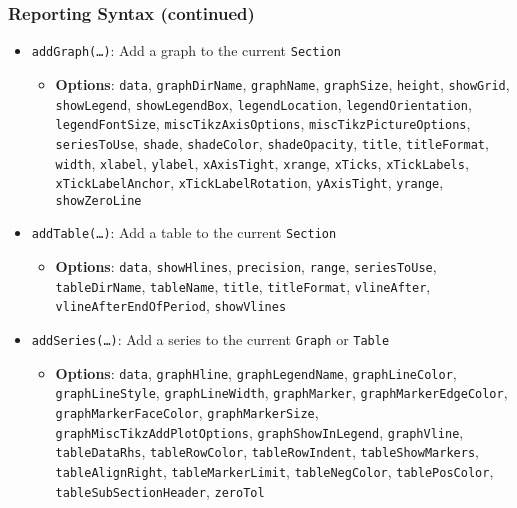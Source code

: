 \documentclass[10pt]{beamer}
\begin{document}
\begin{frame}
  \frametitle{Reporting Syntax (continued)}
  \begin{itemize}
  \item \texttt{addGraph(\ldots)}: Add a graph to the current \texttt{Section}
    \begin{itemize}
    \item \textbf{Options}: \texttt{data}, \texttt{graphDirName}, \texttt{graphName}, \texttt{graphSize}, \texttt{height}, \texttt{showGrid}, \texttt{showLegend}, \texttt{showLegendBox}, \texttt{legendLocation}, \texttt{legendOrientation}, \texttt{legendFontSize}, \texttt{miscTikzAxisOptions}, \texttt{miscTikzPictureOptions}, \texttt{seriesToUse}, \texttt{shade}, \texttt{shadeColor}, \texttt{shadeOpacity}, \texttt{title}, \texttt{titleFormat}, \texttt{width}, \texttt{xlabel}, \texttt{ylabel}, \texttt{xAxisTight}, \texttt{xrange}, \texttt{xTicks}, \texttt{xTickLabels}, \texttt{xTickLabelAnchor}, \texttt{xTickLabelRotation}, \texttt{yAxisTight}, \texttt{yrange}, \texttt{showZeroLine}
    \end{itemize}
  \item \texttt{addTable(\ldots)}: Add a table to the current \texttt{Section}
    \begin{itemize}
    \item \textbf{Options}: \texttt{data}, \texttt{showHlines}, \texttt{precision}, \texttt{range}, \texttt{seriesToUse}, \texttt{tableDirName}, \texttt{tableName}, \texttt{title}, \texttt{titleFormat}, \texttt{vlineAfter}, \texttt{vlineAfterEndOfPeriod}, \texttt{showVlines}
    \end{itemize}
  \item \texttt{addSeries(\ldots)}: Add a series to the current \texttt{Graph} or \texttt{Table}
    \begin{itemize}
    \item \textbf{Options}: \texttt{data}, \texttt{graphHline}, \texttt{graphLegendName}, \texttt{graphLineColor}, \texttt{graphLineStyle}, \texttt{graphLineWidth}, \texttt{graphMarker}, \texttt{graphMarkerEdgeColor}, \texttt{graphMarkerFaceColor}, \texttt{graphMarkerSize}, \texttt{graphMiscTikzAddPlotOptions}, \texttt{graphShowInLegend}, \texttt{graphVline}, \texttt{tableDataRhs}, \texttt{tableRowColor}, \texttt{tableRowIndent}, \texttt{tableShowMarkers}, \texttt{tableAlignRight}, \texttt{tableMarkerLimit}, \texttt{tableNegColor}, \texttt{tablePosColor}, \texttt{tableSubSectionHeader}, \texttt{zeroTol}
    \end{itemize}
  \end{itemize}
\end{frame}
\end{document}
